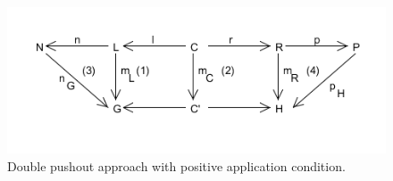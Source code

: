 \begin{figure}[H]
	\centering
	\includegraphics[scale=0.7]{./Figures/Double_Pushout_PAC.png}
	\caption[The Double Pushout approach with PAC]
	{Double pushout approach with positive application condition.}
	\label{fig:DPO_NAC}
\end{figure}






